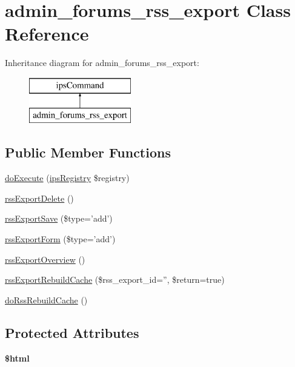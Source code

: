 \hypertarget{classadmin__forums__rss__export}{\section{admin\-\_\-forums\-\_\-rss\-\_\-export Class Reference}
\label{classadmin__forums__rss__export}
}
Inheritance diagram for admin\-\_\-forums\-\_\-rss\-\_\-export\-:\begin{figure}[H]
\begin{center}
\leavevmode
\includegraphics[height=2.000000cm]{classadmin__forums__rss__export}
\end{center}
\end{figure}
\subsection*{Public Member Functions}
\begin{DoxyCompactItemize}
\item 
\hyperlink{classadmin__forums__rss__export_afbc4e912a0604b94d47d66744c64d8ba}{do\-Execute} (\hyperlink{classips_registry}{ips\-Registry} \$registry)
\item 
\hyperlink{classadmin__forums__rss__export_aa4f19e9757d817d4e96b8049635be0a2}{rss\-Export\-Delete} ()
\item 
\hyperlink{classadmin__forums__rss__export_aaa5361ddd9789c6145e6d812953bad9d}{rss\-Export\-Save} (\$type='add')
\item 
\hyperlink{classadmin__forums__rss__export_a89d8633f22e1816a79d8772102d2d985}{rss\-Export\-Form} (\$type='add')
\item 
\hyperlink{classadmin__forums__rss__export_a82b4078ef72e3f6fd707e2b65d216559}{rss\-Export\-Overview} ()
\item 
\hyperlink{classadmin__forums__rss__export_ad09c8285935eb8f3632e1d398e0f42d9}{rss\-Export\-Rebuild\-Cache} (\$rss\-\_\-export\-\_\-id='', \$return=true)
\item 
\hyperlink{classadmin__forums__rss__export_a0a9e948ad1b64f439c019662222cf376}{do\-Rss\-Rebuild\-Cache} ()
\end{DoxyCompactItemize}
\subsection*{Protected Attributes}
\begin{DoxyCompactItemize}
\item 
\hypertarget{classadmin__forums__rss__export_a6f96e7fc92441776c9d1cd3386663b40}{{\bfseries \$html}}\label{classadmin__forums__rss__export_a6f96e7fc92441776c9d1cd3386663b40}

\end{DoxyCompactItemize}
